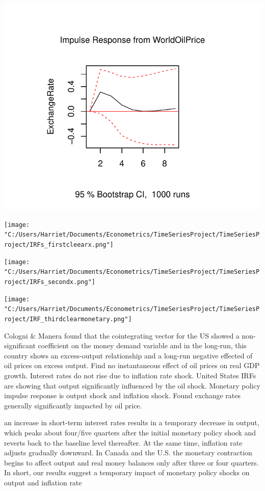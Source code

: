 \documentclass[11pt,preprint, authoryear]{elsarticle}
\numberwithin{equation}{section}
\numberwithin{figure}{section}
\numberwithin{table}{section}
\begin{document}
\begin{center}\includegraphics{README_files/figure-latex/unnamed-chunk-16-5} \end{center}

\texttt{[image: "C:/Users/Harriet/Documents/Econometrics/TimeSeriesProject/TimeSeriesProject/IRFs\_firstcleearx.png"]}

\texttt{[image: "C:/Users/Harriet/Documents/Econometrics/TimeSeriesProject/TimeSeriesProject/IRFs\_secondx.png"]}

\texttt{[image: "C:/Users/Harriet/Documents/Econometrics/TimeSeriesProject/TimeSeriesProject/IRF\_thirdclearmonetary.png"]}

Cologni \& Manera found that the cointegrating vector for the US showed
a non-significant coefficient on the money demand variable and in the
long-run, this country shows an excess-output relationship and a
long-run negative effected of oil prices on excess output. Find no
instantaneous effect of oil prices on real GDP growth. Interest rates do
not rise due to inflation rate shock. United States IRFs are showing
that output significantly influenced by the oil shock. Monetary policy
impulse response is output shock and inflation shock. Found exchange
rates generally significantly impacted by oil price.

an increase in short-term interest rates results in a temporary decrease
in output, which peaks about four/five quarters after the initial
monetary policy shock and reverts back to the baseline level thereafter.
At the same time, inflation rate adjusts gradually downward. In Canada
and the U.S. the monetary contraction begins to affect output and real
money balances only after three or four quarters. In short, our results
suggest a temporary impact of monetary policy shocks on output and
inflation rate
\end{document}
